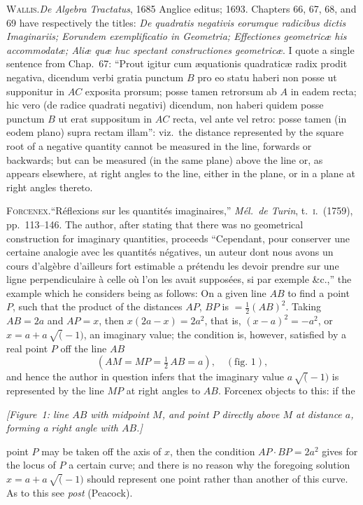 \documentclass[11pt]{article}
\begin{document}
\textsc{Wallis.}\quad \textit{De Algebra Tractatus}, 1685 Anglice editus; 1693. Chapters 66, 67, 68, and 69 have respectively the titles: \textit{De quadratis negativis eorumque radicibus dictis Imaginariis; Eorundem exemplificatio in Geometria; Effectiones geometric\ae{} his accommodat\ae; Ali\ae{} qu\ae{} huc spectant constructiones geometric\ae}. I quote a single sentence from Chap.~67: ``Prout igitur cum \ae quationis quadratic\ae{} radix prodit negativa, dicendum verbi gratia punctum $B$ pro eo statu haberi non posse ut supponitur in $AC$ exposita prorsum; posse tamen retrorsum ab $A$ in eadem recta; hic vero (de radice quadrati negativi) dicendum, non haberi quidem posse punctum $B$ ut erat suppositum in $AC$ recta, vel ante vel retro: posse tamen (in eodem plano) supra rectam illam'': viz.\ the distance represented by the square root of a negative quantity cannot be measured in the line, forwards or backwards; but can be measured (in the same plane) above the line or, as appears elsewhere, at right angles to the line, either in the plane, or in a plane at right angles thereto.

\smallskip

\textsc{Forcenex.}\quad ``R\'eflexions sur les quantit\'es imaginaires,'' \textit{M\'el.\ de Turin}, t.~\textsc{i}.\ (1759), pp.~113--146. The author, after stating that there was no geometrical construction for imaginary quantities, proceeds ``Cependant, pour conserver une certaine analogie avec les quantit\'es n\'egatives, un auteur dont nous avons un cours d'alg\`ebre d'ailleurs fort estimable a pr\'etendu les devoir prendre sur une ligne perpendiculaire \`a celle o\`u l'on les avait suppos\'ees, si par exemple \&c.,'' the example which he considers being as follows: On a given line $AB$ to find a point $P$, such that the product of the distances $AP$, $BP$ is $= \tfrac{1}{2}(AB)^{2}$. Taking $AB = 2a$ and $AP = x$, then $x(2a - x) = 2a^{2}$, that is, $(x - a)^{2} = -a^{2}$, or $x = a + a\,\surd(-1)$, an imaginary value; the condition is, however, satisfied by a real point $P$ off the line $AB$
\[
(AM = MP = \tfrac{1}{2}\,AB = a),\quad (\text{fig.~1}),
\]
and hence the author in question infers that the imaginary value $a\,\surd(-1)$ is represented by the line $MP$ at right angles to $AB$. Forcenex objects to this: if the
\begin{center}\textit{[Figure~1: line $AB$ with midpoint $M$, and point $P$ directly above $M$ at distance $a$, forming a right angle with $AB$.]}\end{center}
point $P$ may be taken off the axis of $x$, then the condition $AP\cdot BP = 2a^{2}$ gives for the locus of $P$ a certain curve; and there is no reason why the foregoing solution $x = a + a\,\surd(-1)$ should represent one point rather than another of this curve. As to this see \textit{post} (Peacock).
\end{document}
